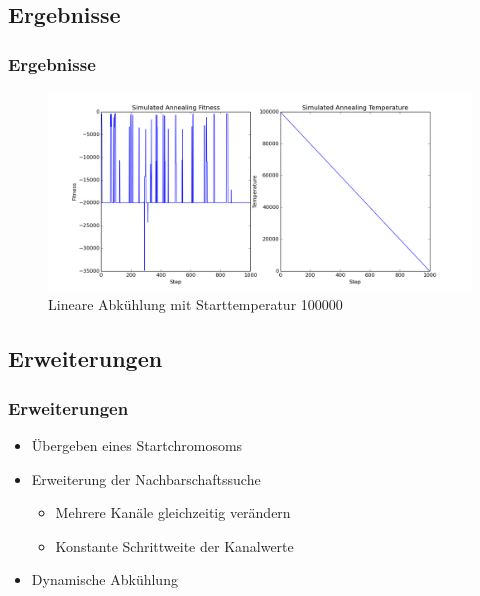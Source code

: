 \subsection{Ergebnisse}

\begin{frame}
\frametitle{Ergebnisse}
    \begin{figure}
        \includegraphics[width=\textwidth]{sa-gs/lin_doof.png}
        \caption{Lineare Abkühlung mit Starttemperatur 100000}
    \end{figure}
\end{frame}

\subsection{Erweiterungen}

\begin{frame}
\frametitle{Erweiterungen}
    \begin{itemize}
        \item Übergeben eines Startchromosoms
        \item Erweiterung der Nachbarschaftssuche
            \begin{itemize}
                \item Mehrere Kanäle gleichzeitig verändern
                \item Konstante Schrittweite der Kanalwerte
            \end{itemize}
        \item Dynamische Abkühlung
    \end{itemize}
\end{frame}
